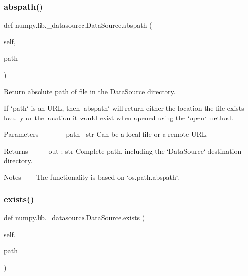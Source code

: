 \subsubsection{\texorpdfstring{abspath()}{abspath()}}
{\footnotesize\ttfamily def numpy.\+lib.\+\_\+datasource.\+Data\+Source.\+abspath (\begin{DoxyParamCaption}\item[{}]{self,  }\item[{}]{path }\end{DoxyParamCaption})}

\begin{DoxyVerb}Return absolute path of file in the DataSource directory.

If `path` is an URL, then `abspath` will return either the location
the file exists locally or the location it would exist when opened
using the `open` method.

Parameters
----------
path : str
    Can be a local file or a remote URL.

Returns
-------
out : str
    Complete path, including the `DataSource` destination directory.

Notes
-----
The functionality is based on `os.path.abspath`.\end{DoxyVerb}
 \mbox{\label{classnumpy_1_1lib_1_1__datasource_1_1DataSource_a587b7321605892c251f765216a973f52}} 
\subsubsection{\texorpdfstring{exists()}{exists()}}
{\footnotesize\ttfamily def numpy.\+lib.\+\_\+datasource.\+Data\+Source.\+exists (\begin{DoxyParamCaption}\item[{}]{self,  }\item[{}]{path }\end{DoxyParamCaption})}

